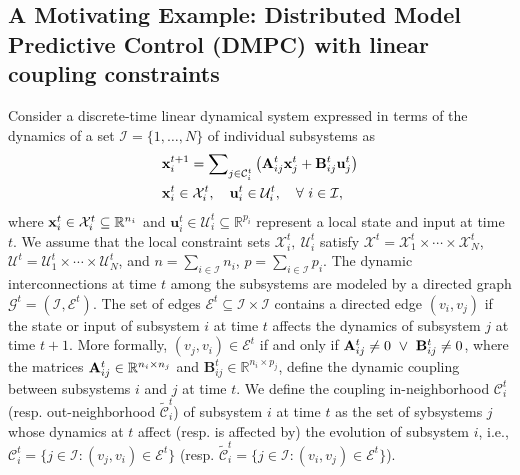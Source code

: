 \documentclass[doublecolumn]{IEEEtran}
\begin{document}
\subsection{A Motivating Example: Distributed Model Predictive Control (DMPC) with linear coupling constraints\label{subsec:mpc}}
Consider a discrete-time linear dynamical system expressed in terms of the dynamics of
a set ${ \mathcal{I} }=\{1,\dots,N\}$ of individual subsystems as
\begin{align}\label{local}
&{ {\bf x} }_i^{t+1} = {\sum\nolimits}_{j\in{\mathcal{C}}_i^t} \left({ {\bf A} }_{ij}^t { {\bf x} }_j^t + {\mathbf{B}}_{ij}^t {\mathbf{u}}_j^t \right)	\nonumber\\
&{ {\bf x} }_i^{t}\in{ \mathcal{X} }_i^{t}, \quad {\mathbf{u}}_i^t\in{\mathcal{U}}_i^t, \quad \forall ~i\in{ \mathcal{I} },
\end{align}
where  ${ {\bf x} }_i^t\in{ \mathcal{X} }_i^t\subseteq {\mathbb R}^{n_i}$ and ${\mathbf{u}}_i^t\in{\mathcal{U}}_i^t\subseteq{\mathbb R}^{p_i}$ represent a local state and input at time $t$. We assume that the local constraint sets ${ \mathcal{X} }_i^t,~{\mathcal{U}}_i^t$ satisfy ${ \mathcal{X} }^t = { \mathcal{X} }_1^t \times \cdots \times { \mathcal{X} }_N^t$, ${\mathcal{U}}^t = {\mathcal{U}}_1^t \times \cdots \times {\mathcal{U}}_N^t$, and $n=\sum_{i\in{ \mathcal{I} }} n_i$, $p=\sum_{i\in{ \mathcal{I} }} p_i$.
The dynamic interconnections at time $t$ among the subsystems are modeled by a directed graph $\mathcal{G}^t=(\mathcal{I},\mathcal{E}^t)$. The set of edges $\mathcal{E}^t\subseteq \mathcal{I}\times\mathcal{I}$ contains a directed edge $(v_i,v_j)$ if the state or input of subsystem $i$ at time $t$ affects the dynamics of subsystem $j$ at time $t+1$. More formally, $(v_j,v_i)\in \mathcal{E}^t$ if and only if  ${ {\bf A} }_{ij}^t \neq 0 ~\vee~ {\mathbf{B}}_{ij}^t \neq 0$, where the matrices ${ {\bf A} }_{ij}^t \in{\mathbb R}^{n_i\times n_j}$ and ${\mathbf{B}}_{ij}^t\in{\mathbb R}^{n_i\times p_j}$, define the dynamic coupling between subsystems $i$ and $j$ at time $t$.
We define the coupling in-neighborhood $\mathcal{C}_i^t$ (resp. out-neighborhood ${\tilde{\mathcal{C}}}_i^t$) of subsystem $i$ at time $t$ as the set of sybsystems $j$ whose dynamics at $t$ affect (resp. is affected by) the evolution of subsystem $i$, i.e.,  ${\mathcal{C}}_i^t = \{ j\in{ \mathcal{I} } : (v_j,v_i)\in \mathcal{E}^t \}$ (resp. ${\tilde{\mathcal{C}}}_i^t = \{ j\in{ \mathcal{I} } : (v_i,v_j)\in \mathcal{E}^t \}$).
\end{document}
